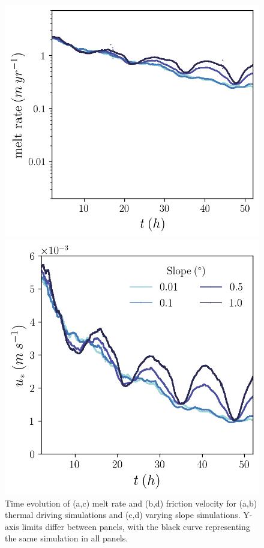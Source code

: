\documentclass[draft]{agujournal2019}
\begin{document}
\begin{figure}[h!]
\begin{minipage}{0.4\textwidth}
    \end{minipage}
    \begin{minipage}{0.4\textwidth}
        \includegraphics[trim={0 0cm 0 0},clip,width=\textwidth]{Figures/melt_cmp_dslope_t.png}
    \end{minipage}%
    \begin{minipage}{0.4\textwidth}
        \includegraphics[trim={0 0cm 0 0},clip,width=\textwidth]{Figures/us_cmp_dslope_t.png}
    \end{minipage}
    \caption{Time evolution of (a,c) melt rate and (b,d) friction velocity for (a,b) thermal driving simulations and (c,d) varying slope simulations. Y-axis limits differ between panels, with the black curve representing the same simulation in all panels.}
    \label{fig:timeseries}
\end{figure}
\end{document}
